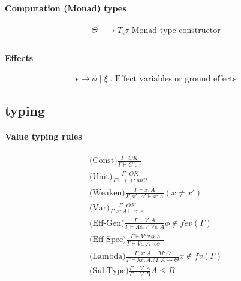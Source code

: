\documentclass[twoside,a4paper,11pt]{article}
\newcommand{\s}{\mbox{ }}
\newcommand{\subtype}{\leq}
\newcommand{\typeJudgement}[2]{\Gamma\vdash #1 \colon #2}
\newcommand{\modVarTypeJudgement}[3]{\Gamma, #1 \vdash #2 \colon #3}
\newcommand{\conditionalTypeRule}[4]{\typeRule{#1}{#2}{#3} #4}
\newcommand{\typeRule}[3]{\displaystyle\mbox{#1}\frac{#2}{#3}}
\begin{document}
\paragraph{Computation (Monad) types}
\begin{equation}
\label{PDefifinition}
\begin{split}
\Theta & \rightarrow T _\epsilon \tau \mbox{ Monad type constructor}\\
\end{split}
\end{equation} 


\paragraph{Effects}

$$ \epsilon \rightarrow \phi \mid \xi .. \mbox{ Effect variables or ground effects}$$

\subsection{typing}

\paragraph{Value typing rules}
\[ \begin{array}{c}
\typeRule{(Const)}{\Gamma\s OK}{\typeJudgement{C^{\gamma}}{\gamma}} \\[3ex]

\typeRule{(Unit)}{\Gamma\s OK}{\typeJudgement{()}{unit}} \\[3ex]

\conditionalTypeRule{(Weaken)}{\typeJudgement{x}{A}}{\modVarTypeJudgement{x' : A'}{x}{A}}{(x \neq x')} \\[3ex]

\typeRule{(Var)}{\Gamma\s OK}{\modVarTypeJudgement{x: A}{x}{A}} \\[3ex]

\conditionalTypeRule{(Eff-Gen)}{\typeJudgement{V}{A}}{\typeJudgement{\Lambda \phi. V}{\forall \phi. A}}{\phi \not\in fev(\Gamma)} \\[3ex]

\typeRule{(Eff-Spec)}{\typeJudgement{V}{\forall \phi. A}}{\typeJudgement{V \epsilon}{A {[\epsilon \phi] }}} \\[3ex]

\conditionalTypeRule{(Lambda)}{\modVarTypeJudgement{x: A}{M}{\Theta}}{\typeJudgement{\lambda x : A. M}{A  \rightarrow \Theta}}{x \not\in fv(\Gamma)}
\\[3ex]
\conditionalTypeRule{(SubType)}{\typeJudgement{V}{A}}{\typeJudgement{V}{B}}{A \subtype B}
\end{array} \]
\end{document}
